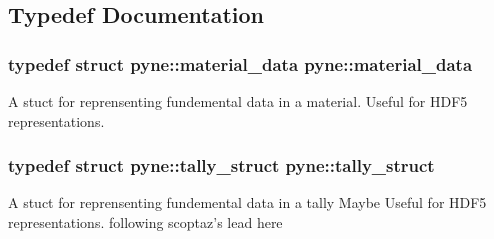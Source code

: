 \subsection{Typedef Documentation}
\hypertarget{namespacepyne_a30fee8818307aa6d8d45dc33ddee6008}{
\subsubsection[{material\-\_\-data}]{\setlength{\rightskip}{0pt plus 5cm}typedef struct {\bf pyne\-::material\-\_\-data}  {\bf pyne\-::material\-\_\-data}}}\label{namespacepyne_a30fee8818307aa6d8d45dc33ddee6008}
A stuct for reprensenting fundemental data in a material. Useful for H\-D\-F5 representations. \hypertarget{namespacepyne_a50f65e8f1e109c362c1cd737d0627941}{
\subsubsection[{tally\-\_\-struct}]{\setlength{\rightskip}{0pt plus 5cm}typedef struct {\bf pyne\-::tally\-\_\-struct}  {\bf pyne\-::tally\-\_\-struct}}}\label{namespacepyne_a50f65e8f1e109c362c1cd737d0627941}
A stuct for reprensenting fundemental data in a tally Maybe Useful for H\-D\-F5 representations. following scoptaz's lead here 

